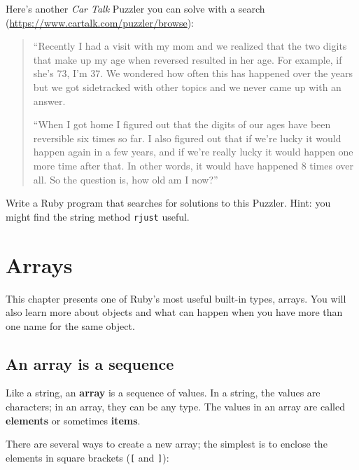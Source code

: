 \documentclass[10pt]{book}
\begin{document}
\begin{exercise}
Here's another {\em Car Talk} Puzzler you can solve with a
search (\url{https://www.cartalk.com/puzzler/browse}):

\begin{quote}
``Recently I had a visit with my mom and we realized that
the two digits that make up my age when reversed resulted in her
age. For example, if she's 73, I'm 37. We wondered how often this has
happened over the years but we got sidetracked with other topics and
we never came up with an answer.

``When I got home I figured out that the digits of our ages have been
reversible six times so far. I also figured out that if we're lucky it
would happen again in a few years, and if we're really lucky it would
happen one more time after that. In other words, it would have
happened 8 times over all. So the question is, how old am I now?''

\end{quote}

Write a Ruby program that searches for solutions to this Puzzler.
Hint: you might find the string method {\tt rjust} useful.


\end{exercise}



\chapter{Arrays}

This chapter presents one of Ruby's most useful built-in types, arrays.
You will also learn more about objects and what can happen when you have
more than one name for the same object.


\section{An array is a sequence}
\label{sequence}

Like a string, an {\bf array} is a sequence of values.  In a string, the
values are characters; in an array, they can be any type.  The values in
an array are called {\bf elements} or sometimes {\bf items}.

There are several ways to create a new array; the simplest is to
enclose the elements in square brackets (\verb"[" and \verb"]"):
\end{document}
